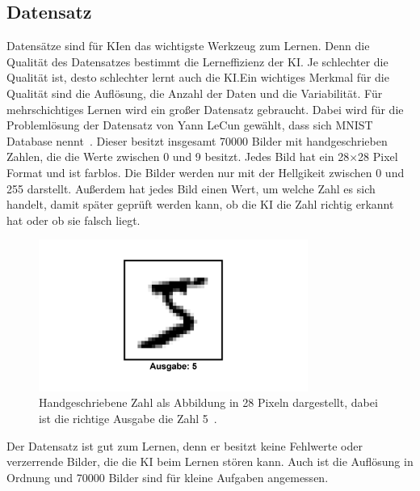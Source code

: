 \documentclass[11pt]{article}
\begin{document}
\subsection{Datensatz}
Datensätze sind für KIen das wichtigste Werkzeug zum Lernen. Denn die Qualität des Datensatzes bestimmt die Lerneffizienz der KI.\@
Je schlechter die Qualität ist, desto schlechter lernt auch die KI.\@ Ein wichtiges Merkmal für die Qualität sind die Auflösung, die Anzahl der Daten und die Variabilität.
Für mehrschichtiges Lernen wird ein großer Datensatz gebraucht. Dabei wird für die Problemlösung der Datensatz von Yann LeCun gewählt, dass sich MNIST Database nennt~\cite{3}.
Dieser besitzt insgesamt 70000 Bilder mit handgeschrieben Zahlen, die die Werte zwischen 0 und 9 besitzt. Jedes Bild hat ein 28$\times$28 Pixel
Format und ist farblos. Die Bilder werden nur mit der Hellgikeit zwischen 0 und 255 darstellt. Außerdem hat jedes Bild einen Wert, um welche Zahl
es sich handelt, damit später geprüft werden kann, ob die KI die Zahl richtig erkannt hat oder ob sie falsch liegt.
\begin{figure}[h]
    \centering
    \includegraphics[width=250pt, keepaspectratio]{images/number}
    \caption[Handgeschriebene Zahl 5~\cite{3}]{Handgeschriebene Zahl als Abbildung in 28 Pixeln dargestellt, dabei ist die richtige Ausgabe die Zahl 5~\cite{3}.}
\end{figure}
Der Datensatz ist gut zum Lernen, denn er besitzt keine Fehlwerte oder verzerrende Bilder, die die KI beim Lernen stören kann. Auch ist die
Auflösung in Ordnung und 70000 Bilder sind für kleine Aufgaben angemessen. %
\end{document}
